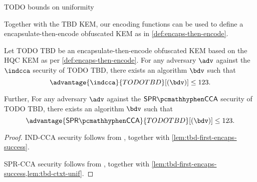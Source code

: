 \begin{lemma}
\label{lem:hqc-ctxt-unif}
    TODO bounds on uniformity
\end{lemma}

Together with the TBD KEM, our encoding functions can be used to define a encapsulate-then-encode obfuscated KEM as in \cref{def:encaps-then-encode}.

\begin{theorem}
    Let TODO TBD be an encapsulate-then-encode obfuscated KEM based on the HQC KEM as per \cref{def:encaps-then-encode}. For any adversary $\adv$ against the $\indcca$ security of TODO TBD, there exists an algorithm $\bdv$ such that
    \[ \advantage{\indcca}{TODO TBD}[(\bdv)] \leq 123. \]

    Further,  For any adversary $\adv$ against the $\sprcca$ security of TODO TBD, there exists an algorithm $\bdv$ such that
    \[ \advantage{\sprcca}{TODO TBD}[(\bdv)] \leq 123. \]
\end{theorem}
\begin{proof}
    IND-CCA security follows from \cite[Theorem~2.12]{CCS:GunSteVei24}, together with \cref{lem:tbd-first-encaps-success}.
    
    SPR-CCA security follows from \cite[Theorem~2.13]{CCS:GunSteVei24}, together with \cref{lem:tbd-first-encaps-success,lem:tbd-ctxt-unif}.
\end{proof}